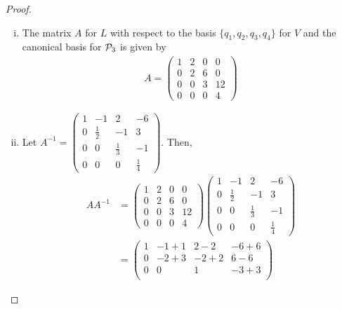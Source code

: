 \begin{proof}
    \renewcommand{\qedsymbol}{$\blacksquare$}
    \begin{enumerate}[(i)]
        \item 
        The matrix $A$ for $L$ with respect to the basis $\{q_1,q_2,q_3,q_4\}$ for $V$ and the canonical basis for $\P_3$ is given by
        \[
            \begin{aligned}
                A=\begin{pmatrix}
                    1 & 2 & 0 & 0\\
                    0 & 2 & 6 & 0\\
                    0 & 0 & 3 & 12\\
                    0 & 0 & 0 & 4
                \end{pmatrix}
            \end{aligned}
        \]
        \item Let $A^{-1}=\begin{pmatrix}
            1 & -1 & 2 & -6\\
            0 & \frac{1}{2} & -1 & 3\\
            0 & 0 & \frac{1}{3} & -1\\
            0 & 0 & 0 & \frac{1}{4}
        \end{pmatrix}$. Then, 
        \[
            \begin{aligned}
                AA^{-1}&=\begin{pmatrix}
                    1 & 2 & 0 & 0\\
                    0 & 2 & 6 & 0\\
                    0 & 0 & 3 & 12\\
                    0 & 0 & 0 & 4
                \end{pmatrix}
                \begin{pmatrix}
                    1 & -1 & 2 & -6\\
                    0 & \frac{1}{2} & -1 & 3\\
                    0 & 0 & \frac{1}{3} & -1\\
                    0 & 0 & 0 & \frac{1}{4}
                \end{pmatrix}\\
                &=\begin{pmatrix}
                    1 & -1+1 & 2-2 & -6+6\\
                    0 & -2+3 & -2+2 & 6-6\\
                    0 & 0 & 1 & -3+3\\

\end{pmatrix}
\end{aligned}\]
\end{enumerate}
\end{proof}

